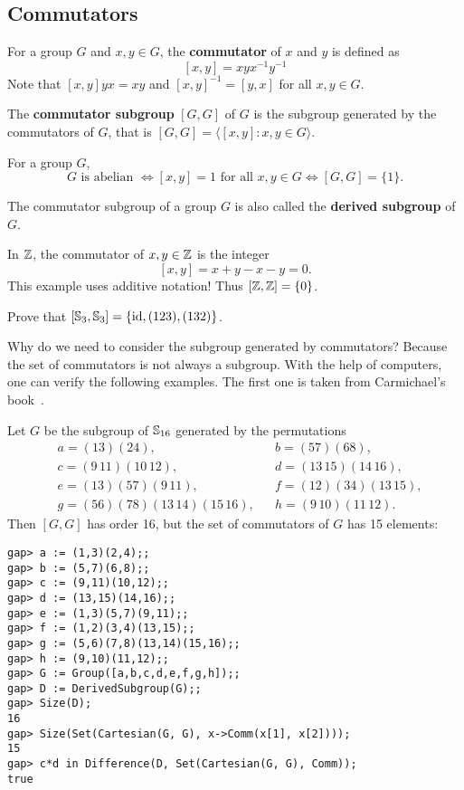 \subsection{Commutators}

For a group $G$ and $x,y\in G$, the \textbf{commutator} 
of $x$ and $y$ is defined as 
\[
[x,y]=xyx^{-1}y^{-1}
\]
Note that $[x,y]yx=xy$ and 
$[x,y]^{-1}=[y,x]$ for all $x,y\in G$. 

\begin{definition}
        The \textbf{commutator subgroup}
        $[G,G]$ of $G$ 
        is the subgroup generated by 
        the commutators of $G$, that is 
        $[G,G]=\langle[x,y]: x,y\in G\rangle$. 
\end{definition}

For a group $G$, 
\[
G\text{ is abelian }
\Longleftrightarrow [x,y]=1\text{ for all $x,y\in G$}
\Longleftrightarrow [G,G]=\{1\}.
\]

The commutator subgroup of a group $G$ is also called the \textbf{derived subgroup} of~$G$. 
       
\begin{example}
        In $\mathbb{Z}$, the commutator of $x,y\in \mathbb{Z}$ 
        is the integer
        \[
        [x,y]=x+y-x-y=0.
        \]
        This example uses additive notation! 
        Thus $[\mathbb{Z},\mathbb{Z}]=\{0\}$. 
\end{example}
        
\begin{exercise}
        Prove that $[\mathbb{S}_3,\mathbb{S}_3]=\{\operatorname{id},(123),(132)\}$.
\end{exercise}
        
Why do we need to consider the subgroup 
generated by commutators? Because the set of commutators 
is not always a subgroup. With the help of computers, 
one can verify the following examples. 
The first one is taken from Carmichael's book~\cite{MR0075938}.

\begin{example}
        Let $G$ be the subgroup of $\mathbb{S}_{16}$ 
        generated by the permutations 
        \begin{align*}
&a = (13)(24),&&
b = (57)(68),\\
&c = (9\,11)(10\,12),&&
d = (13\,15)(14\,16),\\
&e = (13)(57)(9\,11),&&
f = (12)(34)(13\,15),\\
&g = (56)(78)(13\,14)(15\,16),&&
h = (9\,10)(11\,12).
\end{align*}
Then $[G,G]$ has order 16, but the set of commutators of 
$G$ has 15 elements:
\begin{lstlisting}
gap> a := (1,3)(2,4);;
gap> b := (5,7)(6,8);;
gap> c := (9,11)(10,12);;
gap> d := (13,15)(14,16);;
gap> e := (1,3)(5,7)(9,11);;
gap> f := (1,2)(3,4)(13,15);;
gap> g := (5,6)(7,8)(13,14)(15,16);;
gap> h := (9,10)(11,12);;
gap> G := Group([a,b,c,d,e,f,g,h]);;
gap> D := DerivedSubgroup(G);;
gap> Size(D);
16
gap> Size(Set(Cartesian(G, G), x->Comm(x[1], x[2])));
15
gap> c*d in Difference(D, Set(Cartesian(G, G), Comm));
true
\end{lstlisting}
\end{example}

